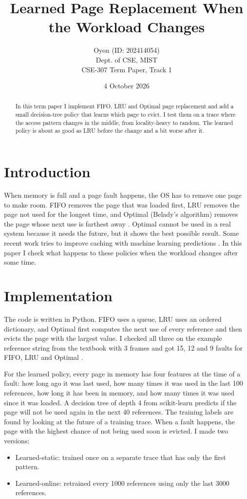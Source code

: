 \documentclass[10pt,a4paper]{article}
\title{Learned Page Replacement When the Workload Changes}
\author{Oyon \quad (ID: 202414054)\\ Dept. of CSE, MIST\\ CSE-307 Term Paper, Track 1}
\date{4 October 2026}
\begin{document}
\maketitle
\begin{abstract}
In this term paper I implement FIFO, LRU and Optimal page replacement and add a small decision-tree policy that learns which page to evict. I test them on a trace where the access pattern changes in the middle, from locality-heavy to random. The learned policy is about as good as LRU before the change and a bit worse after it.
\end{abstract}

\section{Introduction}
When memory is full and a page fault happens, the OS has to remove one page to make room. FIFO removes the page that was loaded first, LRU removes the page not used for the longest time, and Optimal (Belady's algorithm) removes the page whose next use is farthest away \cite{belady1966,silberschatz}. Optimal cannot be used in a real system because it needs the future, but it shows the best possible result. Some recent work tries to improve caching with machine learning predictions \cite{lykouris2018}. In this paper I check what happens to these policies when the workload changes after some time.

\section{Implementation}
The code is written in Python. FIFO uses a queue, LRU uses an ordered dictionary, and Optimal first computes the next use of every reference and then evicts the page with the largest value. I checked all three on the example reference string from the textbook with 3 frames and got 15, 12 and 9 faults for FIFO, LRU and Optimal \cite{silberschatz}.

For the learned policy, every page in memory has four features at the time of a fault: how long ago it was last used, how many times it was used in the last 100 references, how long it has been in memory, and how many times it was used since it was loaded. A decision tree of depth 4 from scikit-learn \cite{pedregosa2011} predicts if the page will not be used again in the next 40 references. The training labels are found by looking at the future of a training trace. When a fault happens, the page with the highest chance of not being used soon is evicted. I made two versions:
\begin{itemize}
\item Learned-static: trained once on a separate trace that has only the first pattern.
\item Learned-online: retrained every 1000 references using only the last 3000 references.
\end{itemize}
\end{document}
